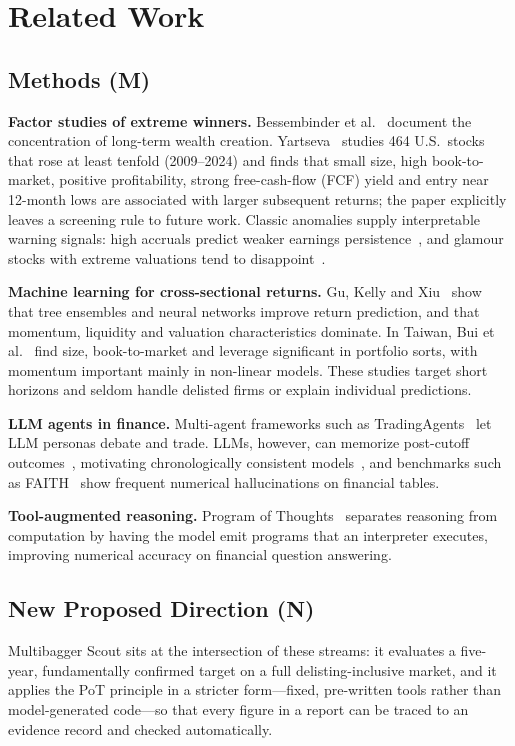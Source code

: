 \documentclass[conference]{IEEEtran}
\begin{document}
\section{Related Work}
\label{sec:related}

\subsection{Methods (M)}
\textbf{Factor studies of extreme winners.} Bessembinder et al.~\cite{b2} document the concentration of long-term wealth creation. Yartseva~\cite{b10} studies 464 U.S.\ stocks that rose at least tenfold (2009--2024) and finds that small size, high book-to-market, positive profitability, strong free-cash-flow (FCF) yield and entry near 12-month lows are associated with larger subsequent returns; the paper explicitly leaves a screening rule to future work. Classic anomalies supply interpretable warning signals: high accruals predict weaker earnings persistence~\cite{b15}, and glamour stocks with extreme valuations tend to disappoint~\cite{b16}.

\textbf{Machine learning for cross-sectional returns.} Gu, Kelly and Xiu~\cite{b9} show that tree ensembles and neural networks improve return prediction, and that momentum, liquidity and valuation characteristics dominate. In Taiwan, Bui et al.~\cite{b14} find size, book-to-market and leverage significant in portfolio sorts, with momentum important mainly in non-linear models. These studies target short horizons and seldom handle delisted firms or explain individual predictions.

\textbf{LLM agents in finance.} Multi-agent frameworks such as TradingAgents~\cite{b13} let LLM personas debate and trade. LLMs, however, can memorize post-cutoff outcomes~\cite{b6,b7}, motivating chronologically consistent models~\cite{b5}, and benchmarks such as FAITH~\cite{b8} show frequent numerical hallucinations on financial tables.

\textbf{Tool-augmented reasoning.} Program of Thoughts~\cite{b4} separates reasoning from computation by having the model emit programs that an interpreter executes, improving numerical accuracy on financial question answering.

\subsection{New Proposed Direction (N)}
Multibagger Scout sits at the intersection of these streams: it evaluates a five-year, fundamentally confirmed target on a full delisting-inclusive market, and it applies the PoT principle in a stricter form---fixed, pre-written tools rather than model-generated code---so that every figure in a report can be traced to an evidence record and checked automatically.
\end{document}

